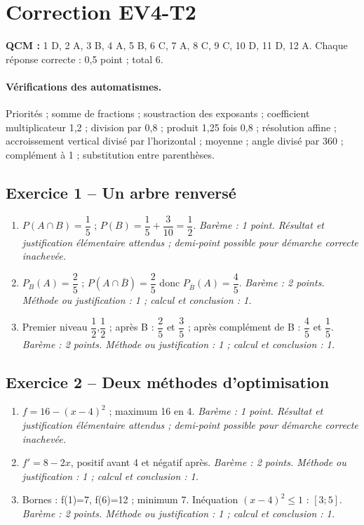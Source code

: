 \clearpage\section*{Correction EV4-T2}\label{EV4-T2-CORR}
\textbf{QCM :} 1 D, 2 A, 3 B, 4 A, 5 B, 6 C, 7 A, 8 C, 9 C, 10 D, 11 D, 12 A. Chaque réponse correcte : 0,5 point ; total 6.
\paragraph{Vérifications des automatismes.} Priorités ; somme de fractions ; soustraction des exposants ; coefficient multiplicateur 1,2 ; division par 0,8 ; produit 1,25 fois 0,8 ; résolution affine ; accroissement vertical divisé par l’horizontal ; moyenne ; angle divisé par 360 ; complément à 1 ; substitution entre parenthèses.
\subsection*{Exercice 1 -- Un arbre renversé}
\begin{enumerate}
\item $P(A\cap B)=\dfrac{1}{5}$ ; $P(B)=\dfrac{1}{5}+\dfrac{3}{10}=\dfrac{1}{2}$. \textit{Barème : 1 point. Résultat et justification élémentaire attendus ; demi-point possible pour démarche correcte inachevée.}
\item $P_B(A)=\dfrac{2}{5}$ ; $P(A\cap\overline B)=\dfrac{2}{5}$ donc $P_{\overline B}(A)=\dfrac{4}{5}$. \textit{Barème : 2 points. Méthode ou justification : 1 ; calcul et conclusion : 1.}
\item Premier niveau $\dfrac{1}{2}$,$\dfrac{1}{2}$ ; après B : $\dfrac{2}{5}$ et $\dfrac{3}{5}$ ; après complément de B : $\dfrac{4}{5}$ et $\dfrac{1}{5}$. \textit{Barème : 2 points. Méthode ou justification : 1 ; calcul et conclusion : 1.}
\end{enumerate}
\subsection*{Exercice 2 -- Deux méthodes d’optimisation}
\begin{enumerate}
\item $f=16-(x-4)^2$ ; maximum 16 en 4. \textit{Barème : 1 point. Résultat et justification élémentaire attendus ; demi-point possible pour démarche correcte inachevée.}
\item $f\prime=8-2x$, positif avant 4 et négatif après. \textit{Barème : 2 points. Méthode ou justification : 1 ; calcul et conclusion : 1.}
\item Bornes : f(1)=7, f(6)=12 ; minimum 7. Inéquation $(x-4)^2\leq1$ : $[3;5]$. \textit{Barème : 2 points. Méthode ou justification : 1 ; calcul et conclusion : 1.}
\end{enumerate}
